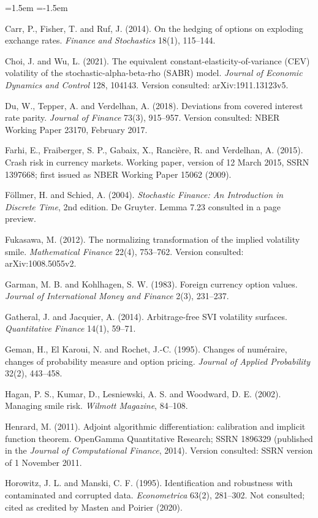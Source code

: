 \documentclass[11pt]{article}
\theoremstyle{remark}
\begin{document}
\begin{list}{}{\leftmargin=1.5em \itemindent=-1.5em \itemsep=2pt \parsep=0pt}
\item Carr, P., Fisher, T. and Ruf, J. (2014). On the hedging of options on exploding exchange rates. \emph{Finance and Stochastics} 18(1), 115--144.
\item Choi, J. and Wu, L. (2021). The equivalent constant-elasticity-of-variance (CEV) volatility of the stochastic-alpha-beta-rho (SABR) model. \emph{Journal of Economic Dynamics and Control} 128, 104143. Version consulted: arXiv:1911.13123v5.
\item Du, W., Tepper, A. and Verdelhan, A. (2018). Deviations from covered interest rate parity. \emph{Journal of Finance} 73(3), 915--957. Version consulted: NBER Working Paper 23170, February 2017.
\item Farhi, E., Fraiberger, S. P., Gabaix, X., Ranci\`ere, R. and Verdelhan, A. (2015). Crash risk in currency markets. Working paper, version of 12 March 2015, SSRN 1397668; first issued as NBER Working Paper 15062 (2009).
\item F\"ollmer, H. and Schied, A. (2004). \emph{Stochastic Finance: An Introduction in Discrete Time}, 2nd edition. De Gruyter. Lemma 7.23 consulted in a page preview.
\item Fukasawa, M. (2012). The normalizing transformation of the implied volatility smile. \emph{Mathematical Finance} 22(4), 753--762. Version consulted: arXiv:1008.5055v2.
\item Garman, M. B. and Kohlhagen, S. W. (1983). Foreign currency option values. \emph{Journal of International Money and Finance} 2(3), 231--237.
\item Gatheral, J. and Jacquier, A. (2014). Arbitrage-free SVI volatility surfaces. \emph{Quantitative Finance} 14(1), 59--71.
\item Geman, H., El Karoui, N. and Rochet, J.-C. (1995). Changes of num\'eraire, changes of probability measure and option pricing. \emph{Journal of Applied Probability} 32(2), 443--458.
\item Hagan, P. S., Kumar, D., Lesniewski, A. S. and Woodward, D. E. (2002). Managing smile risk. \emph{Wilmott Magazine}, 84--108.
\item Henrard, M. (2011). Adjoint algorithmic differentiation: calibration and implicit function theorem. OpenGamma Quantitative Research; SSRN 1896329 (published in the \emph{Journal of Computational Finance}, 2014). Version consulted: SSRN version of 1 November 2011.
\item Horowitz, J. L. and Manski, C. F. (1995). Identification and robustness with contaminated and corrupted data. \emph{Econometrica} 63(2), 281--302. Not consulted; cited as credited by Masten and Poirier (2020).

\end{list}
\end{document}
